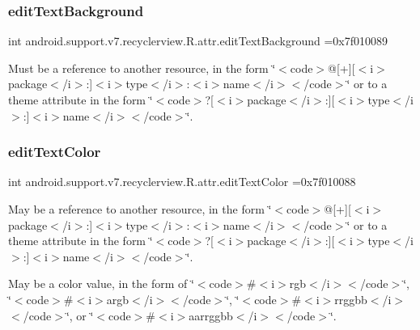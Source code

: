 \subsubsection{\texorpdfstring{edit\+Text\+Background}{editTextBackground}}
{\footnotesize\ttfamily int android.\+support.\+v7.\+recyclerview.\+R.\+attr.\+edit\+Text\+Background =0x7f010089\hspace{0.3cm}{\ttfamily [static]}}

Must be a reference to another resource, in the form \char`\"{}$<$code$>$@\mbox{[}+\mbox{]}\mbox{[}$<$i$>$package$<$/i$>$\+:\mbox{]}$<$i$>$type$<$/i$>$\+:$<$i$>$name$<$/i$>$$<$/code$>$\char`\"{} or to a theme attribute in the form \char`\"{}$<$code$>$?\mbox{[}$<$i$>$package$<$/i$>$\+:\mbox{]}\mbox{[}$<$i$>$type$<$/i$>$\+:\mbox{]}$<$i$>$name$<$/i$>$$<$/code$>$\char`\"{}. \mbox{\label{classandroid_1_1support_1_1v7_1_1recyclerview_1_1R_1_1attr_a9c71256b0ecbe9926f09bfc5a70c86c8}} 
\subsubsection{\texorpdfstring{edit\+Text\+Color}{editTextColor}}
{\footnotesize\ttfamily int android.\+support.\+v7.\+recyclerview.\+R.\+attr.\+edit\+Text\+Color =0x7f010088\hspace{0.3cm}{\ttfamily [static]}}

May be a reference to another resource, in the form \char`\"{}$<$code$>$@\mbox{[}+\mbox{]}\mbox{[}$<$i$>$package$<$/i$>$\+:\mbox{]}$<$i$>$type$<$/i$>$\+:$<$i$>$name$<$/i$>$$<$/code$>$\char`\"{} or to a theme attribute in the form \char`\"{}$<$code$>$?\mbox{[}$<$i$>$package$<$/i$>$\+:\mbox{]}\mbox{[}$<$i$>$type$<$/i$>$\+:\mbox{]}$<$i$>$name$<$/i$>$$<$/code$>$\char`\"{}. 

May be a color value, in the form of \char`\"{}$<$code$>$\#$<$i$>$rgb$<$/i$>$$<$/code$>$\char`\"{}, \char`\"{}$<$code$>$\#$<$i$>$argb$<$/i$>$$<$/code$>$\char`\"{}, \char`\"{}$<$code$>$\#$<$i$>$rrggbb$<$/i$>$$<$/code$>$\char`\"{}, or \char`\"{}$<$code$>$\#$<$i$>$aarrggbb$<$/i$>$$<$/code$>$\char`\"{}. \mbox{\label{classandroid_1_1support_1_1v7_1_1recyclerview_1_1R_1_1attr_a89e634f48f0aa69c6b3b9dd20ba8135d}} 
